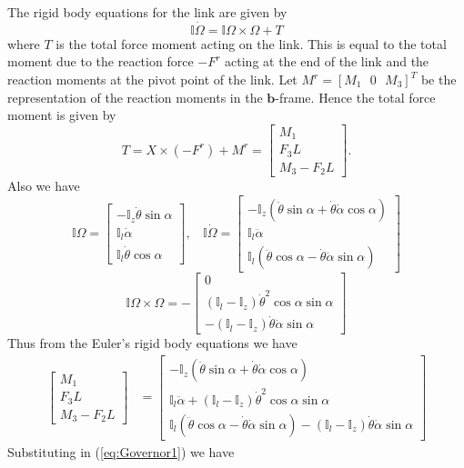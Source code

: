 \documentclass[graybox,envcountchap,sectrefs]{svmonoMuga}
\begin{document}
The rigid body equations for the link are given by
\[
\mathbb{I}\dot{\Omega}=\mathbb{I}\Omega \times \Omega+T
\]
where $T$ is the total force moment acting on the link. This is equal to the total moment due to the reaction force $-F^r$ acting at the end of the link and the reaction moments at the pivot point of the link. Let $M^r=[M_1\:\:\:0\:\:\:M_3]^T$ be the representation of the reaction moments in the $\mathbf{b}$-frame. Hence the total force moment is given by
\[
T=X\times (-F^r)+M^r=\begin{bmatrix}M_1\\F_3L\\M_3-F_2L\end{bmatrix}.
\]
Also we have
\[
\mathbb{I}\Omega=
\begin{bmatrix}
 -\mathbb{I}_z\dot{\theta}\sin{\alpha} \\ \mathbb{I}_l\dot{\alpha} \\ \mathbb{I}_l\dot{\theta}\cos\alpha
\end{bmatrix},\:\:\:\:
\mathbb{I}\dot{\Omega}=\begin{bmatrix}
-\mathbb{I}_z (\ddot{\theta}\sin\alpha+\dot{\theta}\dot{\alpha}\cos\alpha)\\ \mathbb{I}_l\ddot{\alpha} \\
\mathbb{I}_l(\ddot{\theta}\cos\alpha-\dot{\theta}\dot{\alpha}\sin\alpha)
\end{bmatrix}
\]
\[
\mathbb{I}\Omega\times \Omega=-\begin{bmatrix}0\\
(\mathbb{I}_l-\mathbb{I}_z)\dot{\theta}^2\cos\alpha\sin\alpha\\
-(\mathbb{I}_l-\mathbb{I}_z)\dot{\theta}\dot{\alpha}\sin\alpha\end{bmatrix}
\]
Thus from the Euler's rigid body equations we have
\begin{align}
 \begin{bmatrix}M_1\\F_3L\\M_3-F_2L\end{bmatrix}&=\begin{bmatrix}
-\mathbb{I}_z (\ddot{\theta}\sin\alpha+\dot{\theta}\dot{\alpha}\cos\alpha)\\ \mathbb{I}_l\ddot{\alpha} +(\mathbb{I}_l-\mathbb{I}_z)\dot{\theta}^2\cos\alpha\sin\alpha\\
\mathbb{I}_l(\ddot{\theta}\cos\alpha-\dot{\theta}\dot{\alpha}\sin\alpha)-(\mathbb{I}_l-\mathbb{I}_z)\dot{\theta}\dot{\alpha}\sin\alpha
\end{bmatrix} \end{align}
Substituting in (\ref{eq:Governor1}) we have
\end{document}
